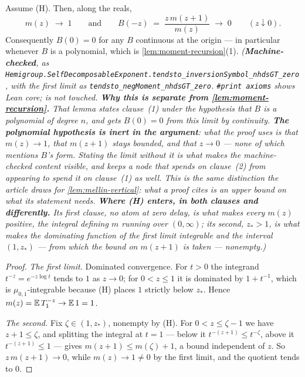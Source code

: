 \begin{lemma}\label{lem:symbol-vanishes-at-origin}
\leanok
Assume (H). Then, along the reals,
\[
  m(z) \;\longrightarrow\; 1
  \qquad\text{and}\qquad
  B(-z) \;=\; \frac{z\,m(z+1)}{m(z)} \;\longrightarrow\; 0
  \qquad (z \downarrow 0).
\]
Consequently $B(0) = 0$ for any $B$ continuous at the origin --- in particular whenever $B$ is a
polynomial, which is \ref{lem:moment-recursion}(1).
\statusT\quad\emph{(\textbf{Machine-checked}, as
\texttt{Hemigroup.SelfDecomposableExponent.tendsto\_inversionSymbol\_nhdsGT\_zero}, with the
first limit as \texttt{tendsto\_negMoment\_nhdsGT\_zero}. \texttt{\#print axioms} shows Lean core;
 is not touched.
\textbf{Why this is separate from \ref{lem:moment-recursion}.} That lemma states clause~(1) under
the hypothesis that $B$ is a polynomial of degree $n$, and gets $B(0) = 0$ from this limit by
continuity. \textbf{The polynomial hypothesis is inert in the argument}: what the proof uses is
that $m(z) \to 1$, that $m(z+1)$ stays bounded, and that $z \to 0$ --- none of which mentions
$B$'s form. Stating the limit without it is what makes the machine-checked content visible, and
keeps a node that spends  on clause~(2) from appearing to spend it on clause~(1) as
well. This is the same distinction the article draws for \ref{lem:mellin-vertical}: what a proof
cites is an upper bound on what its statement needs.
\textbf{Where (H) enters, in both clauses and differently.} Its first clause, no atom at zero
delay, is what makes every $m(z)$ positive, the integral defining $m$ running over $(0,\infty)$;
its second, $z_* > 1$, is what makes the dominating function of the first limit integrable and
the interval $(1, z_*)$ --- from which the bound on $m(z+1)$ is taken --- nonempty.)}
\end{lemma}

\begin{proof}
\leanok
\emph{The first limit.} Dominated convergence. For $t > 0$ the integrand $t^{-z} = e^{-z\log t}$
tends to $1$ as $z \to 0$; for $0 < z \le 1$ it is dominated by $1 + t^{-1}$, which is
$\mu_{0,1}$-integrable because (H) places $1$ strictly below $z_*$. Hence
$m(z) = \mathbb{E}\,T_1^{-z} \to \mathbb{E}\,1 = 1$.

\emph{The second.} Fix $\zeta \in (1, z_*)$, nonempty by (H). For $0 < z \le \zeta - 1$ we have
$z + 1 \le \zeta$, and splitting the integral at $t = 1$ --- below it $t^{-(z+1)} \le t^{-\zeta}$,
above it $t^{-(z+1)} \le 1$ --- gives $m(z+1) \le m(\zeta) + 1$, a bound independent of $z$. So
$z\,m(z+1) \to 0$, while $m(z) \to 1 \ne 0$ by the first limit, and the quotient tends to $0$.
\end{proof}

